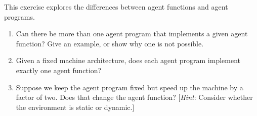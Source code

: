 \documentclass[11pt]{article}
\newenvironment{EX}[2][Exercise]{\begin{trivlist}
\item[{\color{red} \hskip \labelsep {\bfseries #1}\hskip \labelsep {\bfseries #2.}}]}{\end{trivlist}}
\newenvironment{SL}[1][Solution]{\begin{trivlist}
\item[{\color{blue} \hskip \labelsep {\bfseries #1:}}]}{\end{trivlist}}
\begin{document}
\begin{EX}{01.04 (part of 02.06 AIMA3)}
This exercise explores the differences between agent functions and agent programs.
\begin{enumerate}
\item[a)] Can there be more than one agent program that implements a given agent function? Give an example, or show why one is not possible.
\item[b)] Given a fixed machine architecture, does each agent program implement exactly one agent function?
\item[c)] Suppose we keep the agent program fixed but speed up the machine by a factor of two. Does that change the agent function? [\textit{Hint}: Consider whether the environment is static or dynamic.]
\end{enumerate}
\end{EX}


\end{document}
